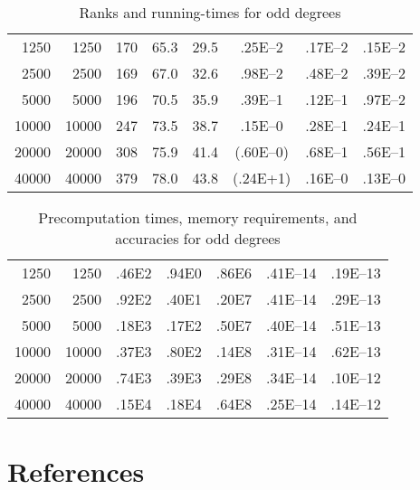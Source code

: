 \documentclass[final,3p,times]{elsarticle}
\begin{document}
\newpage


\begin{table}[h]
\caption{Ranks and running-times for odd degrees}
\label{odds_time}
\vspace{1em}
\begin{tabular*}{\columnwidth}{@{\extracolsep{\fill}}rrcccccc}
 &    &  &  &  &  &  &  \\\hline
 1250 &  1250 &           170 &          65.3 &         29.5 &       .25E--2 &       .17E--2 &       .15E--2 \\\hline
 2500 &  2500 &           169 &          67.0 &         32.6 &       .98E--2 &       .48E--2 &       .39E--2 \\\hline
 5000 &  5000 &           196 &          70.5 &         35.9 &       .39E--1 &       .12E--1 &       .97E--2 \\\hline
10000 & 10000 &           247 &          73.5 &         38.7 &       .15E--0 &       .28E--1 &       .24E--1 \\\hline
20000 & 20000 &           308 &          75.9 &         41.4 &      (.60E--0)&       .68E--1 &       .56E--1 \\\hline
40000 & 40000 &           379 &          78.0 &         43.8 &       (.24E+1)&       .16E--0 &       .13E--0 \\\hline
\end{tabular*}
\end{table}


\begin{table}[h]
\caption{Precomputation times, memory requirements, and accuracies
         for odd degrees}
\label{odds_pre}
\vspace{1em}
\begin{tabular*}{\columnwidth}{@{\extracolsep{\fill}}rrccccc}
 &    &  &  &  &  &  \\\hline
 1250 &  1250 &          .46E2 &          .94E0 &         .86E6 &             .41E--14 &             .19E--13 \\\hline
 2500 &  2500 &          .92E2 &          .40E1 &         .20E7 &             .41E--14 &             .29E--13 \\\hline
 5000 &  5000 &          .18E3 &          .17E2 &         .50E7 &             .40E--14 &             .51E--13 \\\hline
10000 & 10000 &          .37E3 &          .80E2 &         .14E8 &             .31E--14 &             .62E--13 \\\hline
20000 & 20000 &          .74E3 &          .39E3 &         .29E8 &             .34E--14 &             .10E--12 \\\hline
40000 & 40000 &          .15E4 &          .18E4 &         .64E8 &             .25E--14 &             .14E--12 \\\hline
\end{tabular*}
\end{table}



\vspace{.333in}











\section*{References}


\end{document}
